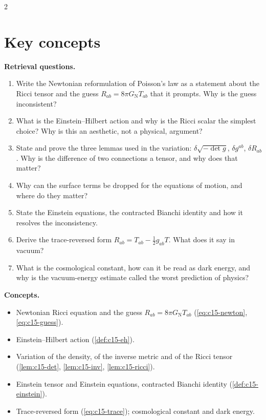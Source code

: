 \begin{paracol}{2}
\section*{Key concepts}
\begin{keyconcepts}
\textbf{Retrieval questions.}
\begin{enumerate}
  \item Write the Newtonian reformulation of Poisson's law as a statement about the Ricci tensor and the guess $R_{ab}=8\pi G_{\mathrm N}T_{ab}$ that it prompts. Why is the guess inconsistent?
  \item What is the Einstein--Hilbert action and why is the Ricci scalar the simplest choice? Why is this an aesthetic, not a physical, argument?
  \item State and prove the three lemmas used in the variation: $\delta\sqrt{-\det g}$, $\delta g^{ab}$, $\delta R_{ab}$. Why is the difference of two connections a tensor, and why does that matter?
  \item Why can the surface terms be dropped for the equations of motion, and where do they matter?
  \item State the Einstein equations, the contracted Bianchi identity and how it resolves the inconsistency.
  \item Derive the trace-reversed form $R_{ab}=T_{ab}-\tfrac12g_{ab}T$. What does it say in vacuum?
  \item What is the cosmological constant, how can it be read as dark energy, and why is the vacuum-energy estimate called the worst prediction of physics?
\end{enumerate}
\textbf{Concepts.}
\begin{itemize}
  \item Newtonian Ricci equation and the guess $R_{ab}=8\pi G_{\mathrm N}T_{ab}$ (\eqref{eq:c15-newton}, \eqref{eq:c15-guess}).
  \item Einstein--Hilbert action (\cref{def:c15-eh}).
  \item Variation of the density, of the inverse metric and of the Ricci tensor (\cref{lem:c15-det}, \cref{lem:c15-inv}, \cref{lem:c15-ricci}).
  \item Einstein tensor and Einstein equations, contracted Bianchi identity (\cref{def:c15-einstein}).
  \item Trace-reversed form (\eqref{eq:c15-trace}); cosmological constant and dark energy.
\end{itemize}
\end{keyconcepts}

\flushside
\end{paracol}
